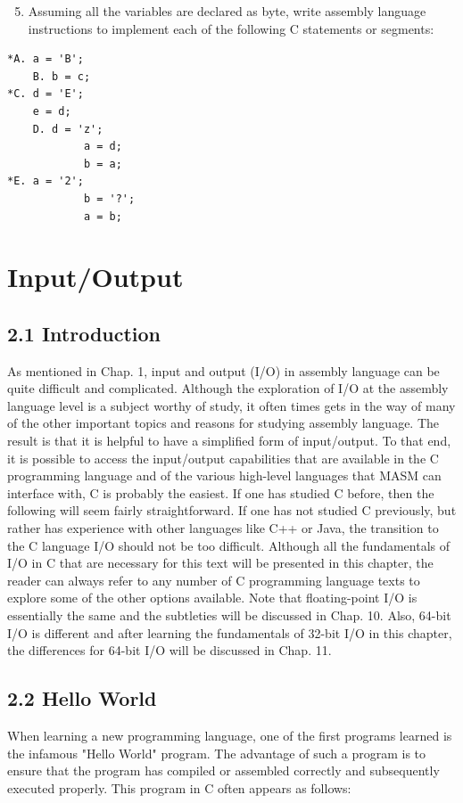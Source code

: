\documentclass[10pt]{article}
\begin{document}
\begin{enumerate}
  \setcounter{enumi}{4}
  \item Assuming all the variables are declared as byte, write assembly language instructions to implement each of the following C statements or segments:
\end{enumerate}

\begin{verbatim}
*A. a = 'B';
    B. b = c;
*C. d = 'E';
    e = d;
    D. d = 'z';
            a = d;
            b = a;
*E. a = '2';
            b = '?';
            a = b;
\end{verbatim}

\section*{Input/Output}
\subsection*{2.1 Introduction}
As mentioned in Chap. 1, input and output (I/O) in assembly language can be quite difficult and complicated. Although the exploration of I/O at the assembly language level is a subject worthy of study, it often times gets in the way of many of the other important topics and reasons for studying assembly language. The result is that it is helpful to have a simplified form of input/output. To that end, it is possible to access the input/output capabilities that are available in the C programming language and of the various high-level languages that MASM can interface with, C is probably the easiest. If one has studied C before, then the following will seem fairly straightforward. If one has not studied C previously, but rather has experience with other languages like C++ or Java, the transition to the C language I/O should not be too difficult. Although all the fundamentals of I/O in C that are necessary for this text will be presented in this chapter, the reader can always refer to any number of C programming language texts to explore some of the other options available. Note that floating-point I/O is essentially the same and the subtleties will be discussed in Chap. 10. Also, 64-bit I/O is different and after learning the fundamentals of 32-bit I/O in this chapter, the differences for 64-bit I/O will be discussed in Chap. 11.

\subsection*{2.2 Hello World}
When learning a new programming language, one of the first programs learned is the infamous "Hello World" program. The advantage of such a program is to ensure that the program has compiled or assembled correctly and subsequently executed properly. This program in C often appears as follows:
\end{document}
